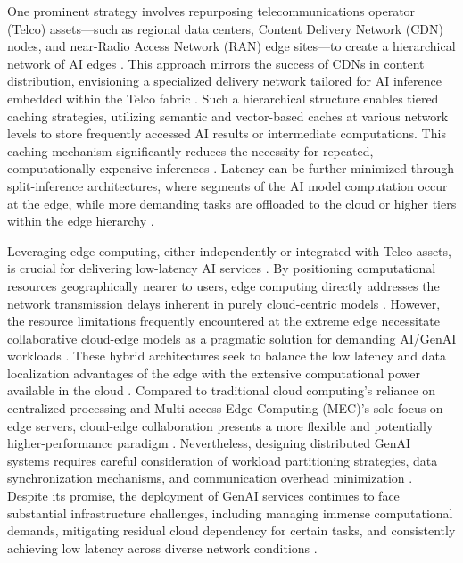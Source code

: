 \documentclass[sigconf]{acmart}
\begin{document}
One prominent strategy involves repurposing telecommunications operator (Telco) assets—such as regional data centers, Content Delivery Network (CDN) nodes, and near-Radio Access Network (RAN) edge sites—to create a hierarchical network of AI edges \cite{ref3}. This approach mirrors the success of CDNs in content distribution, envisioning a specialized delivery network tailored for AI inference embedded within the Telco fabric \cite{ref3}. Such a hierarchical structure enables tiered caching strategies, utilizing semantic and vector-based caches at various network levels to store frequently accessed AI results or intermediate computations. This caching mechanism significantly reduces the necessity for repeated, computationally expensive inferences \cite{ref3}. Latency can be further minimized through split-inference architectures, where segments of the AI model computation occur at the edge, while more demanding tasks are offloaded to the cloud or higher tiers within the edge hierarchy \cite{ref3}.

Leveraging edge computing, either independently or integrated with Telco assets, is crucial for delivering low-latency AI services \cite{ref14, ref25, ref31}. By positioning computational resources geographically nearer to users, edge computing directly addresses the network transmission delays inherent in purely cloud-centric models \cite{ref14, ref31}. However, the resource limitations frequently encountered at the extreme edge necessitate collaborative cloud-edge models as a pragmatic solution for demanding AI/GenAI workloads \cite{ref14, ref23, ref25, ref31}. These hybrid architectures seek to balance the low latency and data localization advantages of the edge with the extensive computational power available in the cloud \cite{ref31}. Compared to traditional cloud computing's reliance on centralized processing and Multi-access Edge Computing (MEC)'s sole focus on edge servers, cloud-edge collaboration presents a more flexible and potentially higher-performance paradigm \cite{ref31}. Nevertheless, designing distributed GenAI systems requires careful consideration of workload partitioning strategies, data synchronization mechanisms, and communication overhead minimization \cite{ref31}. Despite its promise, the deployment of GenAI services continues to face substantial infrastructure challenges, including managing immense computational demands, mitigating residual cloud dependency for certain tasks, and consistently achieving low latency across diverse network conditions \cite{ref31}.
\end{document}
